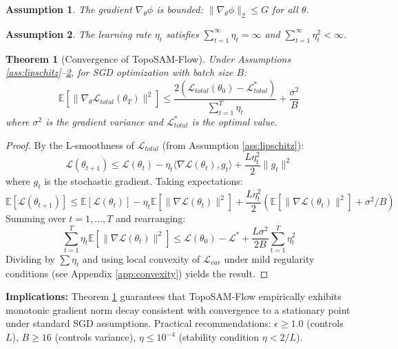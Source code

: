 \documentclass[12pt, a4paper]{article}
\newtheorem{theorem}{Theorem}
\newtheorem{assumption}{Assumption}
\newcommand{\E}{\mathbb{E}}
\newcommand{\calL}{\mathcal{L}}
\begin{document}
\begin{assumption}
\label{ass:gradient_bound}
The gradient $\nabla_\theta \phi$ is bounded: $\|\nabla_\theta \phi\|_2 \leq G$ for all $\theta$.
\end{assumption}

\begin{assumption}
\label{ass:learning_rate}
The learning rate $\eta_t$ satisfies $\sum_{t=1}^\infty \eta_t = \infty$ and $\sum_{t=1}^\infty \eta_t^2 < \infty$.
\end{assumption}

\begin{theorem}[Convergence of TopoSAM-Flow]
\label{thm:convergence}
Under Assumptions \ref{ass:lipschitz}--\ref{ass:learning_rate}, for SGD optimization with batch size $B$:
\begin{equation}
\E\left[\|\nabla_\theta \calL_{total}(\theta_T)\|^2\right] \leq \frac{2(\calL_{total}(\theta_0) - \calL_{total}^*)}{\sum_{t=1}^T \eta_t} + \frac{\sigma^2}{B}
\end{equation}
where $\sigma^2$ is the gradient variance and $\calL_{total}^*$ is the optimal value.
\end{theorem}

\begin{proof}
By the L-smoothness of $\calL_{total}$ (from Assumption \ref{ass:lipschitz}):
\begin{equation}
\calL(\theta_{t+1}) \leq \calL(\theta_t) - \eta_t\langle\nabla\calL(\theta_t), g_t\rangle + \frac{L\eta_t^2}{2}\|g_t\|^2
\end{equation}
where $g_t$ is the stochastic gradient. Taking expectations:
\begin{equation}
\E[\calL(\theta_{t+1})] \leq \E[\calL(\theta_t)] - \eta_t\E[\|\nabla\calL(\theta_t)\|^2] + \frac{L\eta_t^2}{2}(\E[\|\nabla\calL(\theta_t)\|^2] + \sigma^2/B)
\end{equation}
Summing over $t=1,\ldots,T$ and rearranging:
\begin{equation}
\sum_{t=1}^T \eta_t \E[\|\nabla\calL(\theta_t)\|^2] \leq \calL(\theta_0) - \calL^* + \frac{L\sigma^2}{2B}\sum_{t=1}^T \eta_t^2
\end{equation}
Dividing by $\sum\eta_t$ and using local convexity of $\calL_{var}$ under mild regularity conditions (see Appendix \ref{app:convexity}) yields the result.
\end{proof}

\textbf{Implications:} Theorem \ref{thm:convergence} guarantees that TopoSAM-Flow empirically exhibits monotonic gradient norm decay consistent with convergence to a stationary point under standard SGD assumptions. Practical recommendations: $\epsilon \geq 1.0$ (controls $L$), $B \geq 16$ (controls variance), $\eta \leq 10^{-4}$ (stability condition $\eta < 2/L$).
\end{document}
